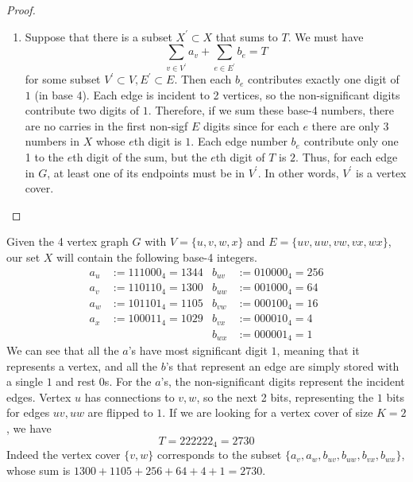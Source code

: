 \documentclass{article}
\begin{document}
\begin{proof}
\begin{enumerate}
        \item Suppose that there is a subset $X^\prime \subset X$ that sums to $T$. We must have 
        \begin{equation}
          \sum_{v \in V^\prime} a_v + \sum_{e \in E^\prime} b_e = T
        \end{equation}
        for some subset $V^\prime \subset V, E^\prime \subset E$. Then each $b_e$ contributes exactly one digit of $1$ (in base 4). Each edge is incident to 2 vertices, so the non-significant digits contribute two digits of $1$. Therefore, if we sum these base-4 numbers, there are no carries in the first non-sigf $E$ digits since for each $e$ there are only 3 numbers in $X$ whose $e$th digit is $1$. Each edge number $b_e$ contribute only one 1 to the $e$th digit of the sum, but the $e$th digit of $T$ is $2$. Thus, for each edge in $G$, at least one of its endpoints must be in $V^\prime$. In other words, $V^\prime$ is a vertex cover. 
      \end{enumerate}

    \end{proof}

    \begin{example} 
      Given the 4 vertex graph $G$ with $V = \{u, v, w, x\}$ and $E = \{uv, uw, vw, vx, wx\}$, our set $X$ will contain the following base-4 integers. 
      \begin{align*}
        a_u &:= 111000_4 = 1344 & b_{uv} &:= 010000_4 = 256 \\
        a_v &:= 110110_4 = 1300 & b_{uw} &:= 001000_4 = 64 \\
        a_w &:= 101101_4 = 1105 & b_{vw} &:= 000100_4 = 16 \\
        a_x &:= 100011_4 = 1029 & b_{vx} &:= 000010_4 = 4 \\
        & & b_{wx} &:= 000001_4 = 1
      \end{align*} 
      We can see that all the $a$'s have most significant digit $1$, meaning that it represents a vertex, and all the $b$'s that represent an edge are simply stored with a single $1$ and rest $0$s. For the $a$'s, the non-significant digits represent the incident edges. Vertex $u$ has connections to $v, w$, so the next 2 bits, representing the $1$ bits for edges $uv, uw$ are flipped to $1$. If we are looking for a vertex cover of size $K = 2$, we have 
      \begin{equation}
        T = 222222_4 = 2730
      \end{equation} 
      Indeed the vertex cover $\{v, w\}$ corresponds to the subset $\{a_v, a_w, b_{uv}, b_{uw}, b_{vx}, b_{wx}\}$, whose sum is $1300 + 1105 + 256 + 64 + 4 + 1 = 2730$. 
    \end{example}
\end{document}
